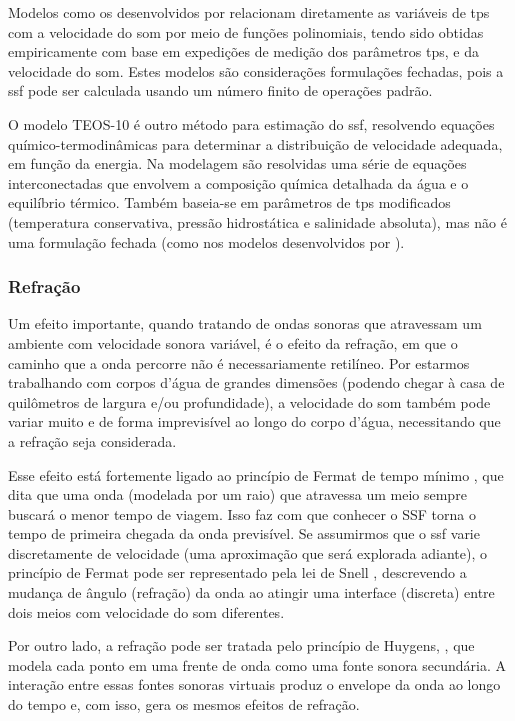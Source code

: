 Modelos como os desenvolvidos por \cite{wilson_equation_1960,mackenzie_nineterm_1981,delgrosso_new_1974} relacionam diretamente as variáveis de \gls{tps} com a velocidade do som por meio de funções polinomiais, tendo sido obtidas empiricamente com base em expedições de medição dos parâmetros \gls{tps}, e da velocidade do som. Estes modelos são considerações formulações fechadas, pois a \gls{ssf} pode ser calculada usando um número finito de operações padrão.

O modelo TEOS-10 \cite{mcdougall_getting_2011} é outro método para estimação do \gls{ssf}, resolvendo equações químico-termodinâmicas para determinar a distribuição de velocidade adequada, em função da energia. Na modelagem são resolvidas uma série de equações interconectadas que envolvem a composição química detalhada da água e o equilíbrio térmico. Também baseia-se em parâmetros de \gls{tps} modificados (temperatura conservativa, pressão hidrostática e salinidade absoluta), mas não é uma formulação fechada (como nos modelos desenvolvidos por \cite{wilson_equation_1960,mackenzie_nineterm_1981,delgrosso_new_1974}).

\subsubsection*{Refração}

Um efeito importante, quando tratando de ondas sonoras que atravessam um ambiente com velocidade sonora variável, é o efeito da refração, em que o caminho que a onda percorre não é necessariamente retilíneo. Por estarmos trabalhando com corpos d'água de grandes dimensões (podendo chegar à casa de quilômetros de largura e/ou profundidade), a velocidade do som também pode variar muito e de forma imprevisível ao longo do corpo d'água, necessitando que a refração seja considerada.

Esse efeito está fortemente ligado ao princípio de Fermat de tempo mínimo \cite{se-yuen_closer_1986}, que dita que uma onda (modelada por um raio) que atravessa um meio sempre buscará o menor tempo de viagem. Isso faz com que conhecer o SSF torna o tempo de primeira chegada da onda previsível. Se assumirmos que o \gls{ssf} varie discretamente de velocidade (uma aproximação que será explorada adiante), o princípio de Fermat pode ser representado pela lei de Snell \cite{perrine_fermats_1961}, descrevendo a mudança de ângulo (refração) da onda ao atingir uma interface (discreta) entre dois meios com velocidade do som diferentes.

Por outro lado, a refração pode ser tratada pelo princípio de Huygens, \cite{bormann_seismic_2012}, que modela cada ponto em uma frente de onda como uma fonte sonora secundária. A interação entre essas fontes sonoras virtuais produz o envelope da onda ao longo do tempo e, com isso, gera os mesmos efeitos de refração.

